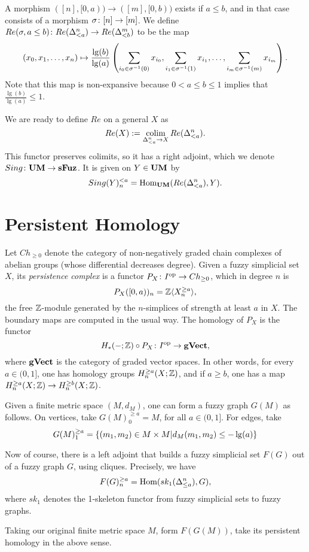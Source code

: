 \documentclass{amsart}
\def\UM{{\bf UM}}
\def\sFuz{{\bf sFuz}}
\def\gVect{{\bf gVect}}
\begin{document}
A morphism $([n],[0,a))\to ([m],[0,b))$ exists if $a\leq b$, and in that case consists of a morphism $\sigma\colon [n]\rightarrow[m]$.  We define $Re(\sigma,a\leq b)\colon Re(\Delta^n_{<a})\rightarrow Re(\Delta^m_{<b})$ to be the map $$(x_0,x_1,\ldots,x_n)\mapsto \frac{\lg(b)}{\lg(a)}\left(\sum_{i_0\in\sigma^\m1(0)}x_{i_0},\sum_{i_1\in\sigma^\m1(1)}x_{i_1},\ldots,\sum_{i_m\in\sigma^\m1(m)}x_{i_m}\right).$$  Note that this map is non-expansive because $0<a\leq b\leq 1$ implies that $\frac{\lg(b)}{\lg(a)}\leq 1$.

We are ready to define $Re$ on a general $X$ as $$Re(X):=\mathop{\textnormal{colim}}_{\Delta^n_{<a}\rightarrow X}Re(\Delta^n_{<a}).$$  This functor preserves colimits, so it has a right adjoint, which we denote $Sing\taking\UM\to\sFuz$.  It is given on $Y\in\UM$ by $$Sing(Y)_n^{<a}=\Hom_\UM(Re(\Delta^n_{<a}),Y).$$

\section{Persistent Homology}

Let $Ch_{\geq 0}$ denote the category of non-negatively graded chain complexes of abelian groups (whose differential decreases degree).  Given a fuzzy simplicial set $X$, its {\em persistence complex} is a functor $P_X\colon I^\textnormal{op}\rightarrow Ch_{\geq 0}$, which in degree $n$ is $$P_X([0,a))_n={\mathbb Z}\langle X_n^{\geq a}\rangle,$$ the free ${\mathbb Z}$-module generated by the $n$-simplices of strength at least $a$ in $X$.  The boundary maps are computed in the usual way.  The homology of $P_X$ is the functor $$H_*(-;\ZZ)\circ P_X\taking I\op\to\gVect,$$ where $\gVect$ is the category of graded vector spaces.  In other words, for every $a\in(0,1]$, one has homology groups $H_n^{\geq a}(X;{\mathbb Z})$, and if $a\geq b$, one has a map $H_n^{\geq a}(X;{\mathbb Z})\rightarrow H_n^{\geq b}(X;{\mathbb Z})$.

Given a finite metric space $(M,d_M)$, one can form a fuzzy graph $G(M)$ as follows.  On vertices, take $G(M)^{\geq a}_0=M$, for all $a\in(0,1]$.  For edges, take $$G(M)^{\geq a}_1=\left\{(m_1,m_2)\in M\times M| d_M(m_1,m_2)\leq-\lg(a)\right\}$$

Now of course, there is a left adjoint that builds a fuzzy simplicial set $F(G)$ out of a fuzzy graph $G$, using cliques.  Precisely, we have $$F(G)^{\geq a}_n=\textnormal{Hom}(sk_1(\Delta^n_{\leq a}),G),$$ where $sk_1$ denotes the 1-skeleton functor from fuzzy simplicial sets to fuzzy graphs. 

Taking our original finite metric space $M$, form $F(G(M))$, take its persistent homology in the above sense.
\end{document}
